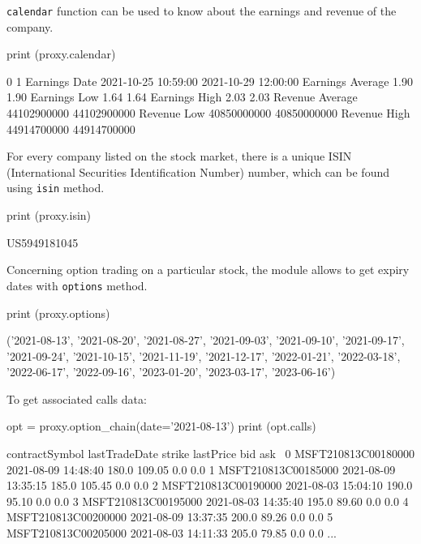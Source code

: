 \texttt{calendar} function can be used to know about the earnings and revenue of the company.

\begin{ipythonnon}
print (proxy.calendar)
\end{ipythonnon}
\begin{ioutput}
                                    0                    1
Earnings Date     2021-10-25 10:59:00  2021-10-29 12:00:00
Earnings Average                 1.90                 1.90
Earnings Low                     1.64                 1.64
Earnings High                    2.03                 2.03
Revenue Average           44102900000          44102900000
Revenue Low               40850000000          40850000000
Revenue High              44914700000          44914700000
\end{ioutput}

For every company listed on the stock market, there is a unique ISIN (International Securities Identification Number) number, which can be found using \texttt{isin} method.

\begin{ipythonnon}
print (proxy.isin)
\end{ipythonnon}
\begin{ioutput}
US5949181045
\end{ioutput}

Concerning option trading on a particular stock, the module allows to get expiry dates with \texttt{options} method.

\begin{ipythonnon}
print (proxy.options)
\end{ipythonnon}
\begin{ioutput}
('2021-08-13', '2021-08-20', '2021-08-27', '2021-09-03', '2021-09-10', 
 '2021-09-17', '2021-09-24', '2021-10-15', '2021-11-19', '2021-12-17', 
 '2022-01-21', '2022-03-18', '2022-06-17', '2022-09-16', '2023-01-20', 
 '2023-03-17', '2023-06-16')
\end{ioutput}

To get associated calls data:
\begin{ipythonnon}
opt = proxy.option_chain(date='2021-08-13')
print (opt.calls)
\end{ipythonnon}
\begin{ioutput}
         contractSymbol       lastTradeDate  strike  lastPrice  bid  ask  \
0   MSFT210813C00180000 2021-08-09 14:48:40   180.0     109.05  0.0  0.0   
1   MSFT210813C00185000 2021-08-09 13:35:15   185.0     105.45  0.0  0.0   
2   MSFT210813C00190000 2021-08-03 15:04:10   190.0      95.10  0.0  0.0   
3   MSFT210813C00195000 2021-08-03 14:35:40   195.0      89.60  0.0  0.0   
4   MSFT210813C00200000 2021-08-09 13:37:35   200.0      89.26  0.0  0.0   
5   MSFT210813C00205000 2021-08-03 14:11:33   205.0      79.85  0.0  0.0   
...
\end{ioutput}

